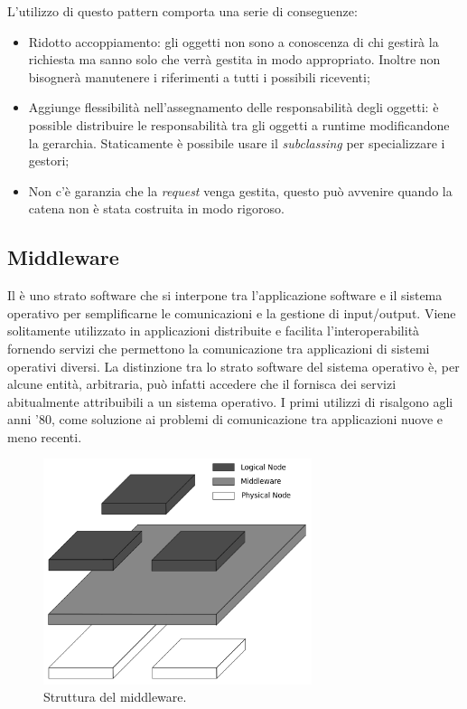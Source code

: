 	L'utilizzo di questo pattern comporta una serie di conseguenze:
		\begin{itemize}
			\item Ridotto accoppiamento: gli oggetti non sono a conoscenza di chi gestirà la richiesta ma sanno solo che verrà gestita in modo appropriato. Inoltre non bisognerà manutenere i riferimenti a tutti i possibili riceventi;
			\item Aggiunge flessibilità nell'assegnamento delle responsabilità degli oggetti: è possible distribuire le responsabilità tra gli oggetti a runtime modificandone la gerarchia. Staticamente è possibile usare il \emph{subclassing} per specializzare i gestori;
 			\item Non c'è garanzia che la \emph{request} venga gestita, questo può avvenire quando la catena non è stata costruita in modo rigoroso.
		\end{itemize}
	
		
	
	\subsection{Middleware} 
	Il  è uno strato software che si interpone tra l'applicazione software e il sistema operativo per semplificarne le comunicazioni e la gestione di input/output. Viene solitamente utilizzato in applicazioni distribuite e facilita l'interoperabilità fornendo servizi che permettono la comunicazione tra applicazioni di sistemi operativi diversi. La distinzione tra lo strato software del sistema operativo è, per alcune entità, arbitraria, può infatti accedere che il  fornisca dei servizi abitualmente attribuibili a un sistema operativo. I primi utilizzi di  risalgono agli anni '80, come soluzione ai problemi di comunicazione tra applicazioni nuove e meno recenti. 
	
	\begin{figure}[h]
	\centering \includegraphics[width=0.7\textwidth]{patterns/Middleware.png}
	\caption{Struttura del middleware.}
	\label{fig:middleware}
	\end{figure}
	
